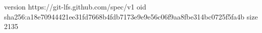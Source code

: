 version https://git-lfs.github.com/spec/v1
oid sha256:a18e70944421ee31fd7668b4fdb7173e9e9e56c06f9aa8fbe314bc0725f5fa4b
size 2135
